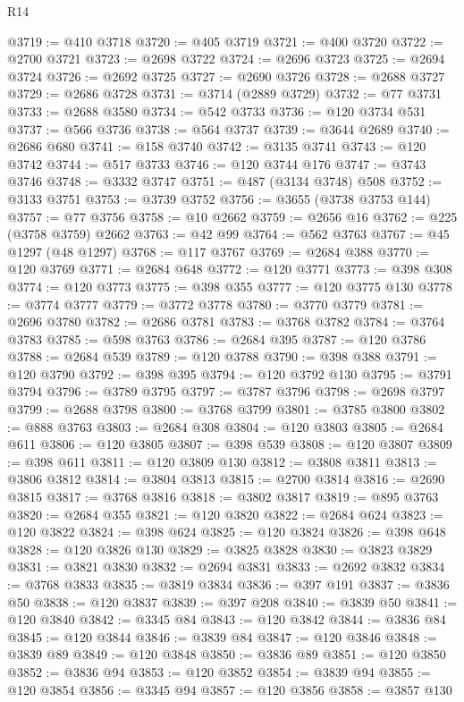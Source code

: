 \begin{lexlean}{R14}
\begin{coremodule}
{{{{{{{{{{{{{{{{{{{{{{{{{{{{{{{{{{{{{{{{{{{{{{{{{{{{{{{{{{{{{{{{{{{{{{{{{{{{{{{{{{{{{{{{{{{{{{{{{{{{{{{{{{@3719 := @410 @3718
@3720 := @405 @3719
@3721 := @400 @3720
@3722 := @2700 @3721
@3723 := @2698 @3722
@3724 := @2696 @3723
@3725 := @2694 @3724
@3726 := @2692 @3725
@3727 := @2690 @3726
@3728 := @2688 @3727
@3729 := @2686 @3728
@3731 := @3714 (@2889 @3729)
@3732 := @77 @3731
@3733 := @2688 @3580
@3734 := @542 @3733
@3736 := @120 @3734 @531
@3737 := @566 @3736
@3738 := @564 @3737
@3739 := @3644 @2689
@3740 := @2686 @680
@3741 := @158 @3740
@3742 := @3135 @3741
@3743 := @120 @3742
@3744 := @517 @3733
@3746 := @120 @3744 @176
@3747 := @3743 @3746
@3748 := @3332 @3747
@3751 := @487 (@3134 @3748) @508
@3752 := @3133 @3751
@3753 := @3739 @3752
@3756 := @3655 (@3738 @3753 @144)
@3757 := @77 @3756
@3758 := @10 @2662
@3759 := @2656 @16
@3762 := @225 (@3758 @3759) @2662
@3763 := @42 @99
@3764 := @562 @3763
@3767 := @45 @1297 (@48 @1297)
@3768 := @117 @3767
@3769 := @2684 @388
@3770 := @120 @3769
@3771 := @2684 @648
@3772 := @120 @3771
@3773 := @398 @308
@3774 := @120 @3773
@3775 := @398 @355
@3777 := @120 @3775 @130
@3778 := @3774 @3777
@3779 := @3772 @3778
@3780 := @3770 @3779
@3781 := @2696 @3780
@3782 := @2686 @3781
@3783 := @3768 @3782
@3784 := @3764 @3783
@3785 := @598 @3763
@3786 := @2684 @395
@3787 := @120 @3786
@3788 := @2684 @539
@3789 := @120 @3788
@3790 := @398 @388
@3791 := @120 @3790
@3792 := @398 @395
@3794 := @120 @3792 @130
@3795 := @3791 @3794
@3796 := @3789 @3795
@3797 := @3787 @3796
@3798 := @2698 @3797
@3799 := @2688 @3798
@3800 := @3768 @3799
@3801 := @3785 @3800
@3802 := @888 @3763
@3803 := @2684 @308
@3804 := @120 @3803
@3805 := @2684 @611
@3806 := @120 @3805
@3807 := @398 @539
@3808 := @120 @3807
@3809 := @398 @611
@3811 := @120 @3809 @130
@3812 := @3808 @3811
@3813 := @3806 @3812
@3814 := @3804 @3813
@3815 := @2700 @3814
@3816 := @2690 @3815
@3817 := @3768 @3816
@3818 := @3802 @3817
@3819 := @895 @3763
@3820 := @2684 @355
@3821 := @120 @3820
@3822 := @2684 @624
@3823 := @120 @3822
@3824 := @398 @624
@3825 := @120 @3824
@3826 := @398 @648
@3828 := @120 @3826 @130
@3829 := @3825 @3828
@3830 := @3823 @3829
@3831 := @3821 @3830
@3832 := @2694 @3831
@3833 := @2692 @3832
@3834 := @3768 @3833
@3835 := @3819 @3834
@3836 := @397 @191
@3837 := @3836 @50
@3838 := @120 @3837
@3839 := @397 @208
@3840 := @3839 @50
@3841 := @120 @3840
@3842 := @3345 @84
@3843 := @120 @3842
@3844 := @3836 @84
@3845 := @120 @3844
@3846 := @3839 @84
@3847 := @120 @3846
@3848 := @3839 @89
@3849 := @120 @3848
@3850 := @3836 @89
@3851 := @120 @3850
@3852 := @3836 @94
@3853 := @120 @3852
@3854 := @3839 @94
@3855 := @120 @3854
@3856 := @3345 @94
@3857 := @120 @3856
@3858 := @3857 @130
}}}}}}}}}}}}}}}}}}}}}}}}}}}}}}}}}}}}}}}}}}}}}}}}}}}}}}}}}}}}}}}}}}}}}}}}}}}}}}}}}}}}}}}}}}}}}}}}}}}}}}}}}}
\end{coremodule}
\end{lexlean}
